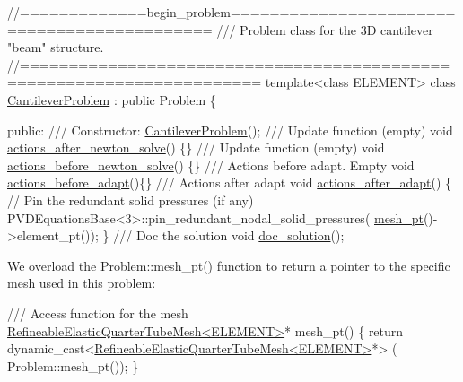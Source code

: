  
\begin{DoxyCodeInclude}
\textcolor{comment}{//=============begin\_problem============================================ }
\textcolor{comment}{/// Problem class for the 3D cantilever "beam" structure.}
\textcolor{comment}{}\textcolor{comment}{//====================================================================== }
\textcolor{keyword}{template}<\textcolor{keyword}{class} ELEMENT>
\textcolor{keyword}{class }\hyperlink{classCantileverProblem}{CantileverProblem} : \textcolor{keyword}{public} Problem
\{

\textcolor{keyword}{public}:
\textcolor{comment}{}
\textcolor{comment}{ /// Constructor:}
\textcolor{comment}{} \hyperlink{classCantileverProblem_abba97fc4b8402bc0363fdf16322f6572}{CantileverProblem}(); 
 \textcolor{comment}{}
\textcolor{comment}{ /// Update function (empty)}
\textcolor{comment}{} \textcolor{keywordtype}{void} \hyperlink{classCantileverProblem_a4a70a4328d287aaa15c7811562122013}{actions\_after\_newton\_solve}() \{\}
\textcolor{comment}{}
\textcolor{comment}{ /// Update function (empty)}
\textcolor{comment}{} \textcolor{keywordtype}{void} \hyperlink{classCantileverProblem_a293902b825898ce043ffce3f0691f5a5}{actions\_before\_newton\_solve}() \{\}
\textcolor{comment}{}
\textcolor{comment}{ /// Actions before adapt. Empty}
\textcolor{comment}{} \textcolor{keywordtype}{void} \hyperlink{classCantileverProblem_a50f8964219c507562945655e0ed5fc23}{actions\_before\_adapt}()\{\}
\textcolor{comment}{}
\textcolor{comment}{ /// Actions after adapt}
\textcolor{comment}{} \textcolor{keywordtype}{void} \hyperlink{classCantileverProblem_af4d135ace3eac657b38de362e1644c75}{actions\_after\_adapt}()
  \{
   \textcolor{comment}{// Pin the redundant solid pressures (if any)}
   PVDEquationsBase<3>::pin\_redundant\_nodal\_solid\_pressures(
    \hyperlink{classCantileverProblem_a20f03209a5031e1bda39da9f2d2ce845}{mesh\_pt}()->element\_pt());
  \}
\textcolor{comment}{}
\textcolor{comment}{ /// Doc the solution}
\textcolor{comment}{} \textcolor{keywordtype}{void} \hyperlink{classCantileverProblem_a7571348f8724e71be4e67dc64cea3877}{doc\_solution}();

\end{DoxyCodeInclude}


We overload the {\ttfamily Problem\+::mesh\+\_\+pt()} function to return a pointer to the specific mesh used in this problem\+:


\begin{DoxyCodeInclude}
 \textcolor{comment}{/// Access function for the mesh}
 \hyperlink{classRefineableElasticQuarterTubeMesh}{RefineableElasticQuarterTubeMesh<ELEMENT>}* mesh\_pt()
  \{
   \textcolor{keywordflow}{return} \textcolor{keyword}{dynamic\_cast<}\hyperlink{classRefineableElasticQuarterTubeMesh}{RefineableElasticQuarterTubeMesh<ELEMENT>}*\textcolor{keyword}{>}
      (
    Problem::mesh\_pt());
  \}

\end{DoxyCodeInclude}


